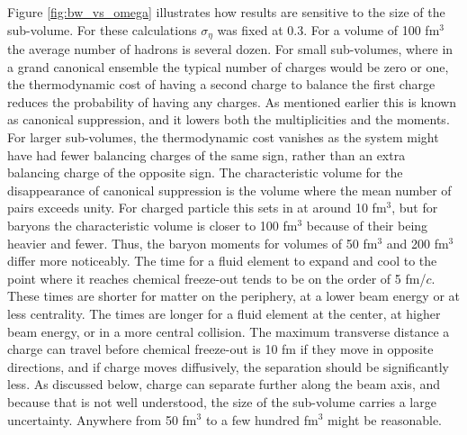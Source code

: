 Figure \ref{fig:bw_vs_omega} illustrates how results are sensitive to the size of the sub-volume. For these calculations $\sigma_\eta$ was fixed at 0.3. For a volume of 100 fm$^3$ the average number of hadrons is several dozen. For small sub-volumes, where in a grand canonical ensemble the typical number of charges would be zero or one, the thermodynamic cost of having a second charge to balance the first charge reduces the probability of having any charges. As mentioned earlier this is known as canonical suppression, and it lowers both the multiplicities and the moments. For larger sub-volumes, the thermodynamic cost vanishes as the system might have had fewer balancing charges of the same sign, rather than an extra balancing charge of the opposite sign. The characteristic volume for the disappearance of canonical suppression is the volume where the mean number of pairs exceeds unity. For charged particle this sets in at around 10 fm$^3$, but for baryons the characteristic volume is closer to 100 fm$^3$ because of their being heavier and fewer. Thus, the baryon moments for volumes of 50 fm$^3$ and 200 fm$^3$ differ more noticeably. The time for a fluid element to expand and cool to the point where it reaches chemical freeze-out tends to be on the order of 5 fm/$c$. These times are shorter for matter on the periphery, at a lower beam energy or at less centrality. The times are longer for a fluid element at the center, at higher beam energy, or in a more central collision. The maximum transverse distance a charge can travel before chemical freeze-out is 10 fm if they move in opposite directions, and if charge moves diffusively, the separation should be significantly less. As discussed below, charge can separate further along the beam axis, and because that is not well understood, the size of the sub-volume carries a large uncertainty. Anywhere from 50 fm$^3$ to a few hundred fm$^3$ might be reasonable. 


